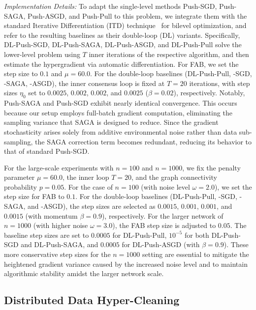 \documentclass{article}
\theoremstyle{plain}
\theoremstyle{definition}
\theoremstyle{remark}
\begin{document}
\textit{Implementation Details:} 
To adapt the single-level methods Push-SGD, Push-SAGA, Push-ASGD, and Push-Pull to this problem, we integrate them with the standard Iterative Differentiation (ITD) technique~\cite{FranceschiHPO2018, GrazziAID2020} for bilevel optimization, and refer to the resulting baselines as their double-loop (DL) variants. 
Specifically, DL-Push-SGD, DL-Push-SAGA, DL-Push-ASGD, and DL-Push-Pull solve the lower-level problem using $T$ inner iterations of the respective algorithm, and then estimate the hypergradient via automatic differentiation. 
For FAB, we set the step size to $0.1$ and $\mu=60.0$. For the double-loop baselines (DL-Push-Pull, -SGD, -SAGA, -ASGD), the inner consensus loop is fixed at $T=20$ iterations, with step sizes $\eta_0$ set to $0.0025$, $0.002$, $0.002$, and $0.0025$ ($\beta=0.02$), respectively. Notably, Push-SAGA and Push-SGD exhibit nearly identical convergence. This occurs because our setup employs full-batch gradient computation, eliminating the sampling variance that SAGA is designed to reduce. Since the gradient stochasticity arises solely from additive environmental noise rather than data sub-sampling, the SAGA correction term becomes redundant, reducing its behavior to that of standard Push-SGD. 

For the large-scale experiments with $n=100$ and $n=1000$, we fix the penalty parameter $\mu=60.0$, the inner loop $T=20$, and the graph connectivity probability $p=0.05$.
For the case of $n=100$ (with noise level $\omega=2.0$), we set the step size for FAB to $0.1$. For the double-loop baselines (DL-Push-Pull, -SGD, -SAGA, and -ASGD), the step sizes are selected as $0.0015$, $0.001$, $0.001$, and $0.0015$ (with momentum $\beta=0.9$), respectively.
For the larger network of $n=1000$ (with higher noise $\omega=3.0$), the FAB step size is adjusted to $0.05$. The baseline step sizes are set to $0.0005$ for DL-Push-Pull, $10^{-5}$ for both DL-Push-SGD and DL-Push-SAGA, and $0.0005$ for DL-Push-ASGD (with $\beta=0.9$). These more conservative step sizes for the $n=1000$ setting are essential to mitigate the heightened gradient variance caused by the increased noise level and to maintain algorithmic stability amidst the larger network scale.

\subsection{Distributed Data Hyper-Cleaning} 
\label{app:details_cleaning}
\end{document}
